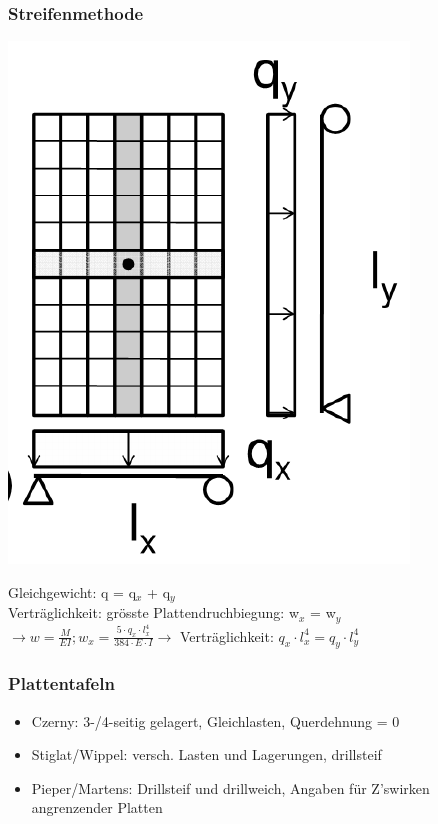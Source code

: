 	\begin{minipage}{0.55\linewidth}
		
		\subsubsection{Streifenmethode}
		
			\includegraphics[width=0.4\linewidth]{images/DW4Achse.PNG}
	
		Gleichgewicht: q = q$_x$ + q$_y$ \\
		Verträglichkeit: grösste Plattendruchbiegung: w$_x$ = w$_y$ \\
		$ \rightarrow w = \frac{M}{EI}; w_x = \frac{5 \cdot q_x \cdot l_x^4}{384 \cdot E \cdot I}  \rightarrow $ Verträglichkeit: $ q_x \cdot l_x^4 = q_y \cdot l_y^4 $ \\
		
	\end{minipage}
	\begin{minipage}{0.4\linewidth}
		
		
		
		\subsubsection{Plattentafeln}
		
		\begin{itemize}
			
			\item Czerny: 3-/4-seitig gelagert, Gleichlasten, Querdehnung = 0
			
			\item Stiglat/Wippel: versch. Lasten und Lagerungen, drillsteif
			
			\item Pieper/Martens: Drillsteif und drillweich, Angaben für Z'swirken angrenzender Platten
			
		\end{itemize}
		
	\end{minipage}

